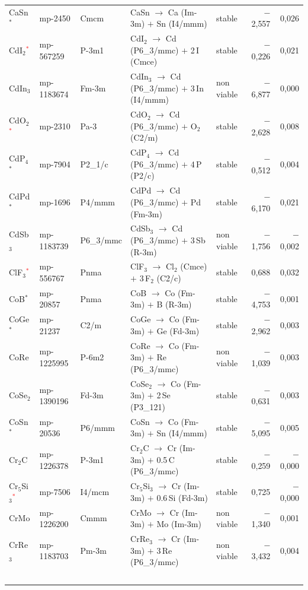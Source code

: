 \begin{longtable}{@{}ll l@{\hspace{4pt}} p{4.6cm} l@{\hspace{4pt}} rr@{}}
CaSn$^*$ & mp-2450 & Cmcm & CaSn $\to$ Ca (Im-3m) $+$ Sn (I4/mmm) & stable & $-$2{,}557 & 0{,}026 \\
CdI$_{2}$\textcolor{red}{$^*$} & mp-567259 & P-3m1 & CdI$_{2}$ $\to$ Cd (P6\_3/mmc) $+$ 2\,I (Cmce) & stable & $-$0{,}226 & 0{,}021 \\
CdIn$_{3}$ & mp-1183674 & Fm-3m & CdIn$_{3}$ $\to$ Cd (P6\_3/mmc) $+$ 3\,In (I4/mmm) & non viable & $-$6{,}877 & 0{,}000 \\
CdO$_{2}$\textcolor{red}{$^*$} & mp-2310 & Pa-3 & CdO$_{2}$ $\to$ Cd (P6\_3/mmc) $+$ O$_{2}$ (C2/m) & stable & $-$2{,}628 & 0{,}008 \\
CdP$_{4}$$^*$ & mp-7904 & P2\_1/c & CdP$_{4}$ $\to$ Cd (P6\_3/mmc) $+$ 4\,P (P2/c) & stable & $-$0{,}512 & 0{,}004 \\
CdPd$^*$ & mp-1696 & P4/mmm & CdPd $\to$ Cd (P6\_3/mmc) $+$ Pd (Fm-3m) & stable & $-$6{,}170 & 0{,}021 \\
CdSb$_{3}$ & mp-1183739 & P6\_3/mmc & CdSb$_{3}$ $\to$ Cd (P6\_3/mmc) $+$ 3\,Sb (R-3m) & non viable & $-$1{,}756 & $-$0{,}002 \\
ClF$_{3}$\textcolor{red}{$^*$} & mp-556767 & Pnma & ClF$_{3}$ $\to$ Cl$_{2}$ (Cmce) $+$ 3\,F$_{2}$ (C2/c) & stable & 0{,}688 & 0{,}032 \\
CoB$^*$ & mp-20857 & Pnma & CoB $\to$ Co (Fm-3m) $+$ B (R-3m) & stable & $-$4{,}753 & 0{,}001 \\
CoGe$^*$ & mp-21237 & C2/m & CoGe $\to$ Co (Fm-3m) $+$ Ge (Fd-3m) & stable & $-$2{,}962 & 0{,}003 \\
CoRe & mp-1225995 & P-6m2 & CoRe $\to$ Co (Fm-3m) $+$ Re (P6\_3/mmc) & non viable & $-$1{,}039 & 0{,}003 \\
CoSe$_{2}$ & mp-1390196 & Fd-3m & CoSe$_{2}$ $\to$ Co (Fm-3m) $+$ 2\,Se (P3\_121) & stable & $-$0{,}631 & 0{,}003 \\
CoSn$^*$ & mp-20536 & P6/mmm & CoSn $\to$ Co (Fm-3m) $+$ Sn (I4/mmm) & stable & $-$5{,}095 & 0{,}005 \\
Cr$_{2}$C & mp-1226378 & P-3m1 & Cr$_{2}$C $\to$ Cr (Im-3m) $+$ 0.5\,C (P6\_3/mmc) & stable & $-$0{,}259 & $-$0{,}000 \\
Cr$_{5}$Si$_{3}$\textcolor{red}{$^*$} & mp-7506 & I4/mcm & Cr$_{5}$Si$_{3}$ $\to$ Cr (Im-3m) $+$ 0.6\,Si (Fd-3m) & stable & 0{,}725 & $-$0{,}000 \\
CrMo & mp-1226200 & Cmmm & CrMo $\to$ Cr (Im-3m) $+$ Mo (Im-3m) & non viable & $-$1{,}340 & 0{,}001 \\
CrRe$_{3}$ & mp-1183703 & Pm-3m & CrRe$_{3}$ $\to$ Cr (Im-3m) $+$ 3\,Re (P6\_3/mmc) & non viable & $-$3{,}432 & 0{,}004 \\
$$
\end{longtable}
